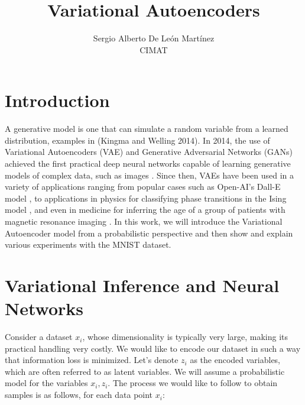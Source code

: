 \documentclass[twocolumn, 9pt]{article}
\title{Variational Autoencoders}
\author{Sergio Alberto De León Martínez \\ CIMAT}
\begin{document}
\selectfont



\section{Introduction}
A generative model is one that can simulate a random variable from a learned distribution, examples in (Kingma and Welling 2014\cite{kingma2013auto}). In 2014, the use of Variational Autoencoders (VAE) and Generative Adversarial Networks (GANs) achieved the first practical deep neural networks capable of learning generative models of complex data, such as images \cite{wikipedia_ia_generativa}. Since then, VAEs have been used in a variety of applications ranging from popular cases such as Open-AI's Dall-E model \cite{finetwork_dalle}, to applications in physics for classifying phase transitions in the Ising model \cite{wetzel2017unsupervised}, and even in medicine for inferring the age of a group of patients with magnetic resonance imaging \cite{zhao2019variational}. In this work, we will introduce the Variational Autoencoder model from a probabilistic perspective and then show and explain various experiments with the MNIST dataset.

\section{Variational Inference and Neural Networks}

Consider a dataset $ { x_{i} }$, whose dimensionality is typically very large, making its practical handling very costly. We would like to encode our dataset in such a way that information loss is minimized. Let's denote $ { z_i } $ as the encoded variables, which are often referred to as latent variables. We will assume a probabilistic model for the variables $ x_i, z_i $. The process we would like to follow to obtain samples is as follows, for each data point $ x_i $:
\end{document}
